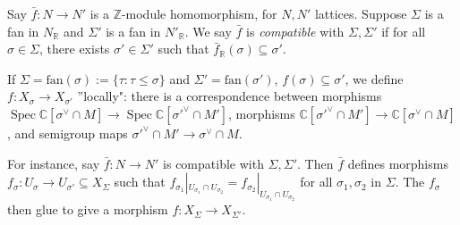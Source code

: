 \documentclass[a4paper,12pt]{amsart}
\newcommand{\C}{\ensuremath{\mathbb{C}}}
\newcommand{\R}{\ensuremath{\mathbb{R}}}
\newcommand{\Z}{\ensuremath{\mathbb{Z}}}
\DeclareMathOperator{\Spec}{Spec}
\begin{document}
\begin{definition}
Say $\bar{f} : N \to N'$ is a $\Z$-module homomorphism, for $N,N'$ lattices. Suppose $\Sigma$ is a fan in $N_\R$ and $\Sigma'$ is a fan in $N'_\R$. We say $\bar{f}$ is \emph{compatible} with $\Sigma, \Sigma'$ if for all $\sigma \in \Sigma$, there exists $\sigma' \in \Sigma'$ such that $\bar{f}_\R(\sigma) \subseteq \sigma'$.
\end{definition}
\begin{Remark}
    If $\Sigma = \text{fan}(\sigma) := \{ \tau: \tau \leq \sigma\}$ and $\Sigma' = \text{fan}(\sigma')$, $f(\sigma) \subseteq \sigma'$, we define $f: X_\sigma \to X_{\sigma'}$ ''locally": there is a correspondence between morphisms $\Spec \C[\sigma^\vee \cap M] \to \Spec \C[\sigma'^{\vee} \cap M']$, morphisms $\C[\sigma'^{\vee} \cap M'] \to  \C[\sigma^\vee \cap M]$, and semigroup maps $\sigma'^{\vee} \cap M' \to \sigma^\vee \cap M$.
\end{Remark}
\noindent For instance, say $\bar{f}: N \to N'$ is compatible with $\Sigma, \Sigma'$. Then $\bar{f}$ defines morphisms $f_\sigma: U_\sigma \to U_{\sigma'} \subseteq X_\Sigma$ such that $f_{\sigma_1} |_{U_{\sigma_1} \cap U_{\sigma_2}} = f_{\sigma_2} |_{U_{\sigma_1} \cap U_{\sigma_2}}$ for all $\sigma_1, \sigma_2$ in $\Sigma$. The $f_\sigma$ then glue to give a morphism $f: X_\Sigma \to X_{\Sigma'}$.
\end{document}
